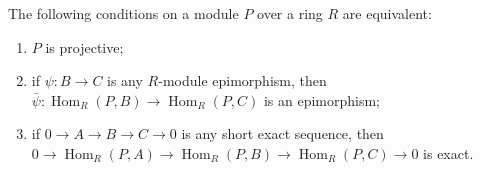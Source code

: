 The following conditions on a module $P$ over a ring $R$ are equivalent:
\begin{enumerate}
\item[(i)] $P$ is projective;
\item[(ii)] if $\psi : B \to C$ is any $R$-module epimorphism, then $\bar{\psi} : \operatorname{Hom}_R(P, B) \to \operatorname{Hom}_R(P, C)$ is an epimorphism;
\item[(iii)] if $0 \to A \to B \to C \to 0$ is any short exact sequence, then $0 \to \operatorname{Hom}_R(P, A) \to \operatorname{Hom}_R(P, B) \to \operatorname{Hom}_R(P, C) \to 0$ is exact.
\end{enumerate}

